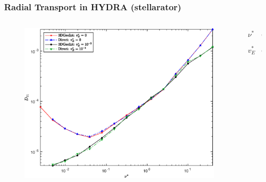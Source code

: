 \documentclass{beamer}
\newcommand{\bea}[1]{\begin{eqnarray} \label{#1}}
\newcommand{\eea}{\end{eqnarray}}
\begin{document}
\begin{frame}
\frametitle{Radial Transport in HYDRA (stellarator)}
\vspace{-1.2cm}
\hspace*{0.1cm}
\begin{columns}[t]
	\begin{column}{0.8\textwidth}
		\begin{figure}
			\vspace*{-1.05cm}
\hspace*{-0.5cm}\includegraphics[width=1\textwidth]{FIGURES/transport_coefficient.eps}
\end{figure}
\end{column}
\hspace*{-1cm}
\begin{column}{0.2\textwidth}
	\vspace*{0.8cm}
	\bea*{} 
		\nu^{\ast} &=& \frac{R_0 \nu_c}{\iota v} \nonumber \\
		\quad \nonumber \\ 
		v_E^{\ast} &=& \frac{E_r}{v B_0} \nonumber
	\eea
	
	\end{column}
\end{columns}

\end{frame}
\end{document}
